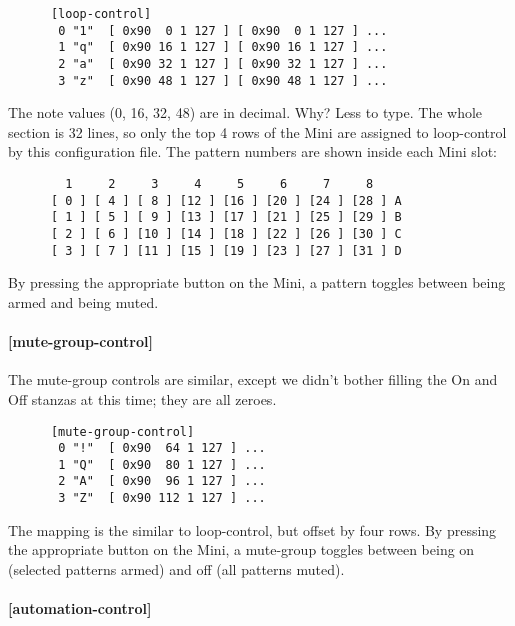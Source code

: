    \begin{verbatim}
      [loop-control]
       0 "1"  [ 0x90  0 1 127 ] [ 0x90  0 1 127 ] ...
       1 "q"  [ 0x90 16 1 127 ] [ 0x90 16 1 127 ] ...
       2 "a"  [ 0x90 32 1 127 ] [ 0x90 32 1 127 ] ...
       3 "z"  [ 0x90 48 1 127 ] [ 0x90 48 1 127 ] ...
   \end{verbatim}

   The note values (0, 16, 32, 48) are in decimal. Why?  Less to type.
   The whole section is 32 lines, so only the top 4 rows of the Mini are
   assigned to loop-control by this configuration file.  The pattern numbers are
   shown inside each Mini slot:

   \begin{verbatim}
        1     2     3     4     5     6     7     8 
      [ 0 ] [ 4 ] [ 8 ] [12 ] [16 ] [20 ] [24 ] [28 ] A
      [ 1 ] [ 5 ] [ 9 ] [13 ] [17 ] [21 ] [25 ] [29 ] B
      [ 2 ] [ 6 ] [10 ] [14 ] [18 ] [22 ] [26 ] [30 ] C
      [ 3 ] [ 7 ] [11 ] [15 ] [19 ] [23 ] [27 ] [31 ] D
   \end{verbatim}

   By pressing the appropriate button on the Mini, a pattern toggles between being
   armed and being muted.

\paragraph{[mute-group-control]}
\label{paragraph:patterns_mute_group_control}

   The mute-group controls are similar, except we didn't bother filling the On
   and Off stanzas at this time; they are all zeroes.

   \begin{verbatim}
      [mute-group-control]
       0 "!"  [ 0x90  64 1 127 ] ...
       1 "Q"  [ 0x90  80 1 127 ] ...
       2 "A"  [ 0x90  96 1 127 ] ...
       3 "Z"  [ 0x90 112 1 127 ] ...
   \end{verbatim}

   The mapping is the similar to loop-control, but offset by four rows.
   By pressing the appropriate button on the Mini, a mute-group toggles between
   being on (selected patterns armed) and off (all patterns muted).

\paragraph{[automation-control]}
\label{paragraph:patterns_automation_control}

